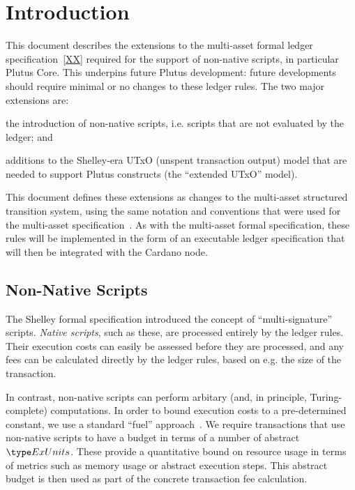 \section{Introduction}

This document describes the extensions to the multi-asset formal ledger specification~\ref{XX}
required for the support of non-native scripts, in particular Plutus Core. This underpins future Plutus development: future developments should require minimal or no changes to these ledger rules.
%
The two major extensions are:
\begin{inparaenum}
\item
the introduction
of non-native scripts, i.e. scripts that are not evaluated by the ledger; and
\item
  additions to the Shelley-era UTxO (unspent transaction output) model that are needed to support Plutus
  constructs (the ``extended UTxO'' model).
\end{inparaenum}
This document defines these extensions as changes to the multi-asset structured transition system,
using the same notation and conventions that were used for the multi-asset specification~\cite{XX}.
As with the multi-asset formal specification, these rules will be implemented in the form of an executable ledger specification that will then be
integrated with the Cardano node.

\subsection{Non-Native Scripts}

The Shelley formal specification introduced the concept of ``multi-signature'' scripts.
\emph{Native scripts}, such as these, are processed entirely by the ledger rules.
Their execution costs can easily be assessed before they are processed,
and any fees can be calculated directly by the ledger rules, based on e.g. the
size of the transaction.

In contrast, non-native scripts can perform arbitary
(and, in principle, Turing-complete) computations.
In order to bound execution costs to a pre-determined constant, we use a standard ``fuel'' approach~\cite{XX}.
We require transactions that use non-native scripts
to have a budget in terms of a number of abstract $\ExUnits$.
These provide a quantitative bound on resource usage in terms of metrics such as memory usage or abstract execution steps.
This abstract budget is then used as part of the concrete transaction fee calculation.

